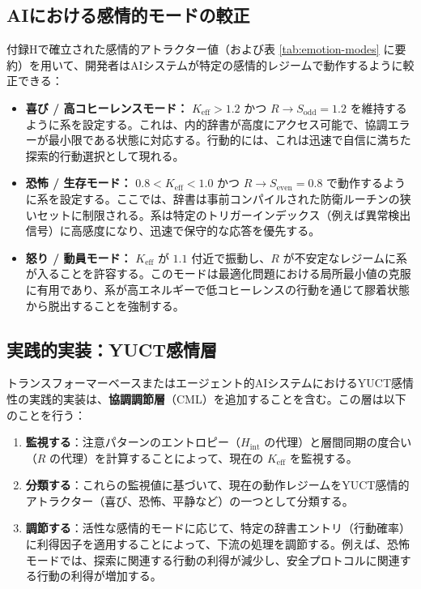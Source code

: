 \documentclass[12pt,a4paper]{article}
\begin{document}
	\subsection{AIにおける感情的モードの較正}
	
	付録Hで確立された感情的アトラクター値（および表 \ref{tab:emotion-modes} に要約）を用いて、開発者はAIシステムが特定の感情的レジームで動作するように較正できる：
	
	\begin{itemize}
		\item \textbf{喜び / 高コヒーレンスモード：} \(K_{\mathrm{eff}} > 1.2\) かつ \(R \to S_{\mathrm{odd}} = 1.2\) を維持するように系を設定する。これは、内的辞書が高度にアクセス可能で、協調エラーが最小限である状態に対応する。行動的には、これは迅速で自信に満ちた探索的行動選択として現れる。
		\item \textbf{恐怖 / 生存モード：} \(0.8 < K_{\mathrm{eff}} < 1.0\) かつ \(R \to S_{\mathrm{even}} = 0.8\) で動作するように系を設定する。ここでは、辞書は事前コンパイルされた防衛ルーチンの狭いセットに制限される。系は特定のトリガーインデックス（例えば異常検出信号）に高感度になり、迅速で保守的な応答を優先する。
		\item \textbf{怒り / 動員モード：} \(K_{\mathrm{eff}}\) が \(1.1\) 付近で振動し、\(R\) が不安定なレジームに系が入ることを許容する。このモードは最適化問題における局所最小値の克服に有用であり、系が高エネルギーで低コヒーレンスの行動を通じて膠着状態から脱出することを強制する。
	\end{itemize}
	
	\subsection{実践的実装：YUCT感情層}
	
	トランスフォーマーベースまたはエージェント的AIシステムにおけるYUCT感情性の実践的実装は、\textbf{協調調節層}（CML）を追加することを含む。この層は以下のことを行う：
	
	\begin{enumerate}
		\item \textbf{監視する}：注意パターンのエントロピー（\(H_{\mathrm{int}}\) の代理）と層間同期の度合い（\(R\) の代理）を計算することによって、現在の \(K_{\mathrm{eff}}\) を監視する。
		\item \textbf{分類する}：これらの監視値に基づいて、現在の動作レジームをYUCT感情的アトラクター（喜び、恐怖、平静など）の一つとして分類する。
		\item \textbf{調節する}：活性な感情的モードに応じて、特定の辞書エントリ（行動確率）に利得因子を適用することによって、下流の処理を調節する。例えば、恐怖モードでは、探索に関連する行動の利得が減少し、安全プロトコルに関連する行動の利得が増加する。
	\end{enumerate}
	
\end{document}
